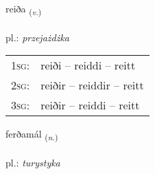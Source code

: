 \documentclass[frontgrid, backgrid]{flacards}\usepackage[]{graphicx}\usepackage[]{xcolor}
\begin{document}
\renewcommand{\flhead}{\vskip5pt \fboxsep=0pt {\small\bfseries\footnotesize Sagnorð | czasownik}}
\renewcommand{\fcfoot}{\vskip5pt \fboxsep=0pt \hspace{2pt}{\small\bfseries\footnotesize 3K}}

\renewcommand{\blhead}{\vskip5pt {\small\bfseries\footnotesize Sagnorð | czasownik }}
\renewcommand{\bcfoot}{\vskip5pt \hspace{2pt}{\small\bfseries\footnotesize 3K}}


{reiða \small{\textsubscript{(\textit{v.})}} \\[1ex] %
\textphonetic{[reiːða]} \\
pl.: \emph{przejażdżka} \\  [2ex]
\renewcommand*{\arraystretch}{0.8}
\begin{tabular}{p{1cm}l}
\textsc{1sg}: & reiði -- reiddi -- reitt \\ 
\textsc{2sg}: & reiðir -- reiddir -- reitt \\ 
\textsc{3sg}: & reiðir -- reiddi -- reitt \\ 
\end{tabular}
}

\renewcommand{\flhead}{\vskip5pt \fboxsep=0pt {\small\bfseries\footnotesize Nafnorð | rzeczownik}}
\renewcommand{\fcfoot}{\vskip5pt \fboxsep=0pt \hspace{2pt}{\small\bfseries\footnotesize 3K}}

\renewcommand{\blhead}{\vskip5pt {\small\bfseries\footnotesize Nafnorð | rzeczownik }}
\renewcommand{\bcfoot}{\vskip5pt \hspace{2pt}{\small\bfseries\footnotesize 3K}}


{ferðamál \small{\textsubscript{(\textit{n.})}} \\[1ex] %
\textphonetic{[fɛrðamaul]} \\
pl.: \emph{turystyka} \\  [2ex]
\renewcommand*{\arraystretch}{0.8}
}
\end{document}
